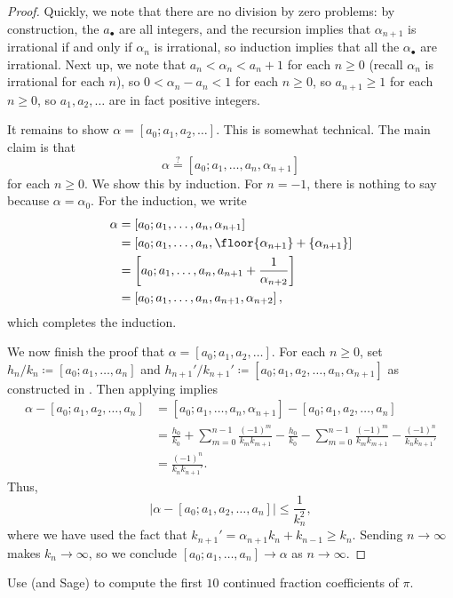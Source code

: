 \documentclass[../notes.tex]{subfiles}
\begin{document}
\begin{proof}
	Quickly, we note that there are no division by zero problems: by construction, the $a_\bullet$ are all integers, and the recursion implies that $\alpha_{n+1}$ is irrational if and only if $\alpha_n$ is irrational, so induction implies that all the $\alpha_\bullet$ are irrational. Next up, we note that $a_n<\alpha_n<a_n+1$ for each $n\ge0$ (recall $\alpha_n$ is irrational for each $n$), so $0<\alpha_n-a_n<1$ for each $n\ge0$, so $a_{n+1}\ge1$ for each $n\ge0$, so $a_1,a_2,\ldots$ are in fact positive integers.

	It remains to show $\alpha=[a_0;a_1,a_2,\ldots]$. This is somewhat technical. The main claim is that
	\[\alpha\stackrel?=[a_0;a_1,\ldots,a_n,\alpha_{n+1}]\]
	for each $n\ge0$. We show this by induction. For $n=-1$, there is nothing to say because $\alpha=\alpha_0$. For the induction, we write
	\begin{align*}
		\alpha &= [a_0;a_1,\ldots,a_n,\alpha_{n+1}] \\
		&= [a_0;a_1,\ldots,a_n,\floor{\alpha_{n+1}}+\{\alpha_{n+1}\}] \\
		&= \left[a_0;a_1,\ldots,a_n,a_{n+1}+\frac1{\alpha_{n+2}}\right] \\
		&= \left[a_0;a_1,\ldots,a_n,a_{n+1},\alpha_{n+2}\right],
	\end{align*}
	which completes the induction.

	We now finish the proof that $\alpha=[a_0;a_1,a_2,\ldots]$. For each $n\ge0$, set $h_n/k_n\coloneqq[a_0;a_1,\ldots,a_n]$ and $h_{n+1}'/k_{n+1}'\coloneqq[a_0;a_1,a_2,\ldots,a_n,\alpha_{n+1}]$ as constructed in . Then applying  implies
	\begin{align*}
		\alpha-[a_0;a_1,a_2,\ldots,a_n] &= [a_0;a_1,\ldots,a_n,\alpha_{n+1}]-[a_0;a_1,a_2,\ldots,a_n] \\
		&= \frac{h_0}{k_0}+\sum_{m=0}^{n-1}\frac{(-1)^m}{k_mk_{m+1}}-\frac{h_0}{k_0}-\sum_{m=0}^{n-1}\frac{(-1)^m}{k_mk_{m+1}}-\frac{(-1)^n}{k_nk_{n+1}'} \\
		&= \frac{(-1)^n}{k_nk_{n+1}'}.
	\end{align*}
	Thus,
	\[\left|\alpha-[a_0;a_1,a_2,\ldots,a_n]\right|\le\frac1{k_n^2},\]
	where we have used the fact that $k_{n+1}'=\alpha_{n+1}k_n+k_{n-1}\ge k_n$. Sending $n\to\infty$ makes $k_n\to\infty$, so we conclude $[a_0;a_1,\ldots,a_n]\to\alpha$ as $n\to\infty$.
\end{proof}
\begin{exe}
	Use  (and Sage) to compute the first $10$ continued fraction coefficients of $\pi$.
\end{exe}
\end{document}
